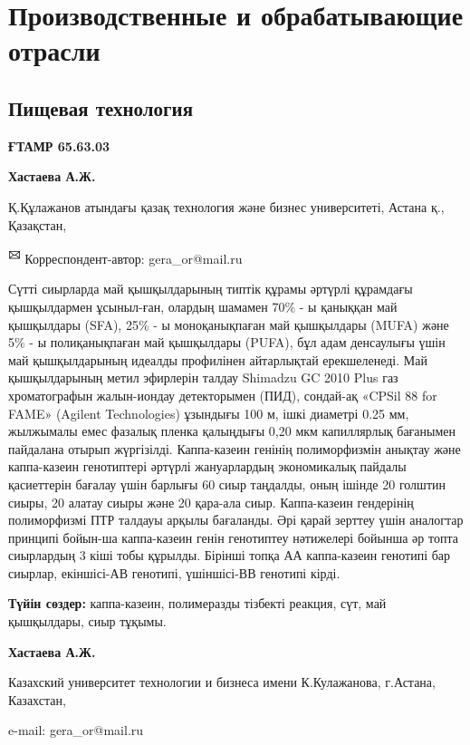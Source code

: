 \let\cleardoublepage\clearpage
\part{Производственные и обрабатывающие отрасли}
\chapter{Пищевая технология}
{\bfseries ҒТАМР 65.63.03}


\begin{center}

{\bfseries Хастаева А.Ж.}

Қ.Құлажанов атындағы қазақ технология және бизнес университеті, Астана қ., Қазақстан,
\end{center}

{\bfseries \textsuperscript{🖂}} Корреспондент-автор: gera\_or@mail.ru

Сүтті сиырларда май қышқылдарының типтік құрамы әртүрлі құрамдағы
қышқылдармен ұсыныл-ған, олардың шамамен 70\% - ы қаныққан май қышқылдары
(SFA), 25\% - ы моноқанықпаған май қышқылдары (MUFA) және 5\% - ы
полиқанықпаған май қышқылдары (PUFA), бұл адам денсаулығы үшін май
қышқылдарының идеалды профилінен айтарлықтай ерекшеленеді. Май
қышқылдарының метил эфирлерін талдау Shimadzu GC 2010 Plus газ
хроматографын жалын-иондау детекторымен (ПИД), сондай-ақ «CPSil 88 for
FAME» (Agilent Technologies) ұзындығы 100 м, ішкі диаметрі 0.25 мм,
жылжымалы емес фазалық пленка қалыңдығы 0,20 мкм капиллярлық бағанымен
пайдалана отырып жүргізілді. Каппа-казеин генінің полиморфизмін анықтау
және каппа-казеин генотиптері әртүрлі жануарлардың экономикалық пайдалы
қасиеттерін бағалау үшін барлығы 60 сиыр таңдалды, оның ішінде 20
голштин сиыры, 20 алатау сиыры және 20 қара-ала сиыр. Каппа-казеин
гендерінің полиморфизмі ПТР талдауы арқылы бағаланды. Әрі қарай зерттеу
үшін аналогтар принципі бойын-ша каппа-казеин генін генотиптеу нәтижелері
бойынша әр топта сиырлардың 3 кіші тобы құрылды. Бірінші топқа АА
каппа-казеин генотипі бар сиырлар, екіншісі-АВ генотипі, үшіншісі-ВВ
генотипі кірді.

{\bfseries Түйін сөздер:} каппа-казеин, полимеразды тізбекті реакция, сүт,
май қышқылдары, сиыр тұқымы.

\begin{center}

{\bfseries Хастаева А.Ж.}

Казахский университет технологии и бизнеса имени К.Кулажанова, г.Астана,
Казахстан,

e-mail: gera\_or@mail.ru
\end{center}


